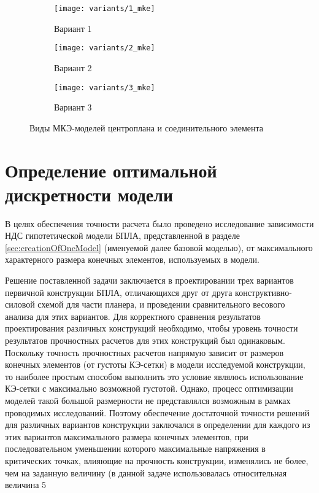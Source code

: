 \begin{figure}[H]
\centering
\begin{subfigure}[b]{0.32\textwidth}
	\texttt{[image: variants/1\_mke]}		\caption{Вариант 1}
	\label{fig:variants_mke:1}
\end{subfigure}
\hspace{\fill}
\begin{subfigure}[b]{0.32\textwidth}
	\texttt{[image: variants/2\_mke]}
		\caption{Вариант 2}
		\label{fig:variants_mke:2}
\end{subfigure}
\hspace{\fill}
\begin{subfigure}[b]{0.32\textwidth}
	\texttt{[image: variants/3\_mke]}
		\caption{Вариант 3}
		\label{fig:variants_mke:3}
\end{subfigure}
\hspace{\fill}
\caption{Виды МКЭ-моделей центроплана и соединительного элемента}
\label{fig:variants_mke}
\end{figure}	



\section{Определение оптимальной дискретности модели}
\label{sec:optimalMKESize}

В целях обеспечения точности расчета было проведено исследование зависимости 
НДС гипотетической модели БПЛА, представленной в разделе \ref{sec:creationOfOneModel} (именуемой далее базовой моделью), от максимального характерного размера конечных элементов, используемых в модели. 

Решение поставленной задачи заключается в проектировании трех вариантов первичной конструкции БПЛА, отличающихся друг от друга конструктивно-силовой схемой для части планера, и проведении сравнительного весового анализа для этих вариантов. Для корректного сравнения результатов проектирования различных конструкций необходимо, чтобы уровень точности результатов прочностных расчетов для этих конструкций был одинаковым. Поскольку точность прочностных расчетов напрямую зависит от размеров конечных элементов (от густоты КЭ-сетки) в модели исследуемой конструкции, то наиболее простым способом выполнить это условие являлось использование КЭ-сетки с максимально возможной густотой. Однако, процесс оптимизации моделей такой большой размерности не представлялся возможным в рамках проводимых исследований. Поэтому обеспечение достаточной точности решений для различных вариантов конструкции заключался в определении для каждого из этих вариантов максимального размера конечных элементов, при последовательном уменьшении которого максимальные напряжения в критических точках, влияющие на прочность конструкции, изменялись не более, чем на заданную величину (в данной задаче использовалась относительная величина 5%



